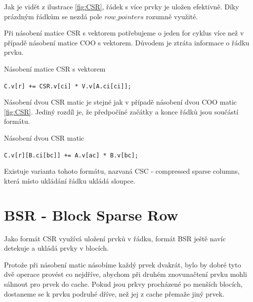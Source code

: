 Jak je vidět z ilustrace \ref{fig:CSR}, řádek s více prvky je uložen efektivně. Díky prázdným řádkům se nezdá pole $row\_pointers$ rozumně využité.

Při násobení matice CSR s vektorem potřebujeme o jeden for cyklus více než v případě násobení matice COO s vektorem. Důvodem je ztráta informace o řádku prvku.

\begin{algorithm}[H]
	\caption{Násobení matice CSR s vektorem}\label{csr-mvm}
	\begin{algorithmic}[1]
				\State \texttt{C.v[r] += CSR.v[ci] * V.v[A.ci[ci]];}
			\EndFor
		\EndFor
		\EndProcedure
	\end{algorithmic}
\end{algorithm}

Násobení dvou CSR matic je stejné jak v případě násobení dvou COO matic \ref{fig:CSR}. Jediný rozdíl je, že předpočíné začátky a konce řádků jsou součástí formátu.

\label{alg:csr-mmm}
\begin{algorithm}[H]
	\caption{Násobení dvou CSR matic}\label{csr-mmm}
	\begin{algorithmic}[1]
					\State \texttt{C.v[r][B.ci[bc]] += A.v[ac] * B.v[bc];}
				\EndFor
			\EndFor
		\EndFor
		\EndProcedure
	\end{algorithmic}
\end{algorithm}

Existuje varianta tohoto formátu, nazvaná CSC - compressed sparse columns, která místo ukládání řádku ukládá sloupce.

\section{BSR - Block Sparse Row}

Jako formát CSR využívá uložení prvků v řádku, formát BSR ještě navíc detekuje a ukládá prvky v blocích.

Protože při násobení matic násobíme každý prvek dvakrát, bylo by dobré tyto dvě operace provést co nejdříve, abychom při druhém znovunačtení prvku mohli sáhnout pro prvek do cache. Pokud jsou prkvy procházené po menších blocích, dostaneme se k prvku podruhé dříve, než jej z cache přemaže jiný prvek.

